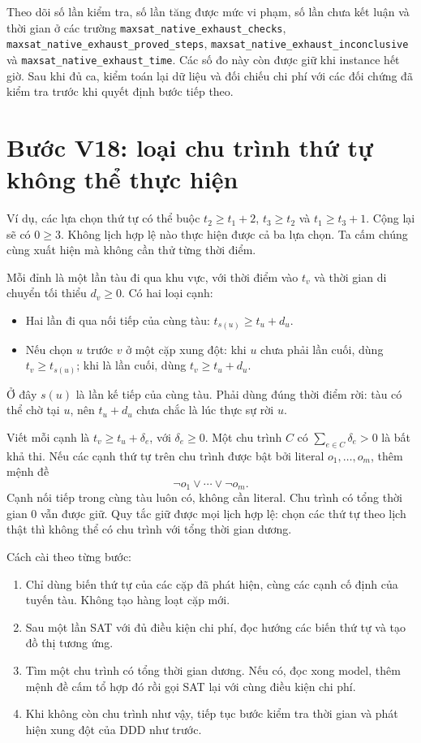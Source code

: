 \documentclass[11pt,a4paper]{article}
\newcommand{\file}[1]{\nolinkurl{#1}}
\begin{document}
Theo dõi số lần kiểm tra, số lần tăng được mức vi phạm, số lần chưa kết
luận và thời gian ở các trường \file{maxsat_native_exhaust_checks},
\file{maxsat_native_exhaust_proved_steps},
\file{maxsat_native_exhaust_inconclusive} và
\file{maxsat_native_exhaust_time}. Các số đo này còn được giữ khi
instance hết giờ. Sau khi đủ ca, kiểm toán lại dữ liệu và đối chiếu chi phí
với các đối chứng đã kiểm tra trước khi quyết định bước tiếp theo.

\section{Bước V18: loại chu trình thứ tự không thể thực hiện}

Ví dụ, các lựa chọn thứ tự có thể buộc $t_2\geq t_1+2$,
$t_3\geq t_2$ và $t_1\geq t_3+1$. Cộng lại sẽ có $0\geq3$.
Không lịch hợp lệ nào thực hiện được cả ba lựa chọn. Ta cấm chúng cùng
xuất hiện mà không cần thử từng thời điểm.

Mỗi đỉnh là một lần tàu đi qua khu vực, với thời điểm vào $t_v$ và thời
gian di chuyển tối thiểu $d_v\geq0$. Có hai loại cạnh:
\begin{itemize}
\item Hai lần đi qua nối tiếp của cùng tàu: $t_{s(u)}\geq t_u+d_u$.
\item Nếu chọn $u$ trước $v$ ở một cặp xung đột: khi $u$ chưa phải lần
cuối, dùng $t_v\geq t_{s(u)}$; khi là lần cuối, dùng $t_v\geq t_u+d_u$.
\end{itemize}
Ở đây $s(u)$ là lần kế tiếp của cùng tàu. Phải dùng đúng thời điểm rời:
tàu có thể chờ tại $u$, nên $t_u+d_u$ chưa chắc là lúc thực sự rời $u$.

Viết mỗi cạnh là $t_v\geq t_u+\delta_e$, với $\delta_e\geq0$.
Một chu trình $C$ có $\sum_{e\in C}\delta_e>0$ là bất khả thi.
Nếu các cạnh thứ tự trên chu trình được bật bởi literal $o_1,\ldots,o_m$,
thêm mệnh đề
\[
 \neg o_1\lor\cdots\lor\neg o_m.
\]
Cạnh nối tiếp trong cùng tàu luôn có, không cần literal. Chu trình có
tổng thời gian 0 vẫn được giữ. Quy tắc giữ được mọi lịch hợp lệ: chọn các
thứ tự theo lịch thật thì không thể có chu trình với tổng thời gian dương.

Cách cài theo từng bước:
\begin{enumerate}
\item Chỉ dùng biến thứ tự của các cặp đã phát hiện, cùng các cạnh cố
định của tuyến tàu. Không tạo hàng loạt cặp mới.
\item Sau một lần SAT với đủ điều kiện chi phí, đọc hướng các biến thứ
tự và tạo đồ thị tương ứng.
\item Tìm một chu trình có tổng thời gian dương. Nếu có, đọc xong model,
thêm mệnh đề cấm tổ hợp đó rồi gọi SAT lại với cùng điều kiện chi phí.
\item Khi không còn chu trình như vậy, tiếp tục bước kiểm tra thời gian
và phát hiện xung đột của DDD như trước.
\end{enumerate}
\end{document}
